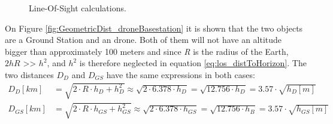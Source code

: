 \begin{figure}[H]
    \hfill
	\hfill
    \hfill
    \caption{Line-Of-Sight calculations.}
\end{figure}

On Figure \ref{fig:GeometricDist_droneBasestation} it is shown that the two objects are a Ground Station and an drone. Both of them will not have an altitude bigger than approximately 100 meters and since \textit{R} is the radius of the Earth, $2hR$ >> $h^2$, and $h^2$ is therefore neglected in equation \ref{eq:los_distToHorizon}. The two distances $D_D$ and $D_{GS}$ have the same expressions in both cases:
\begin{align*}
	D_D [km] &= \sqrt{2\cdot R \cdot h_D + h_{D}^2} \approx \sqrt{2\cdot 6.378\cdot h_D} = \sqrt{12.756\cdot h_D} = 3.57\cdot \sqrt{h_D[m]} \\
	D_{GS} [km] &= \sqrt{2\cdot R \cdot h_{GS} + h_{GS}^2} \approx \sqrt{2\cdot 6.378\cdot h_{GS}} = \sqrt{12.756\cdot h_B} = 3.57\cdot \sqrt{h_{GS}[m]}
\end{align*}

